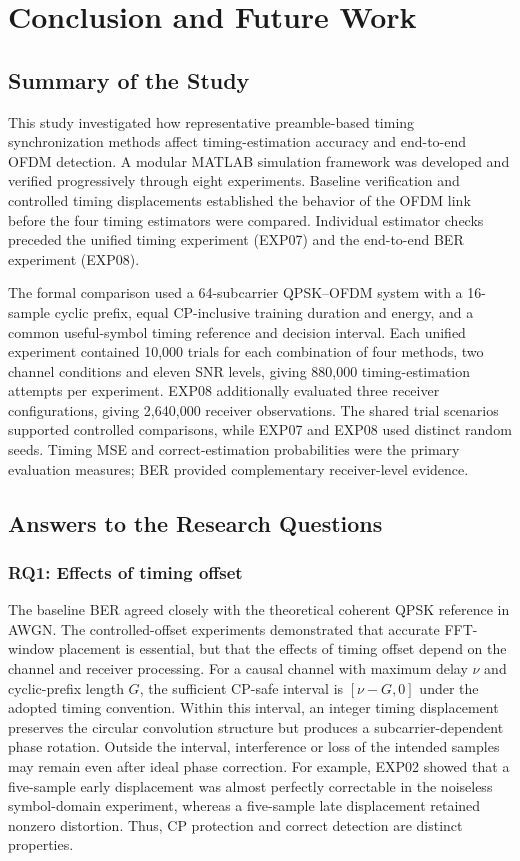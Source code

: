 \chapter{Conclusion and Future Work}
\label{chap:conclusion}

\section{Summary of the Study}

This study investigated how representative preamble-based timing
synchronization methods affect timing-estimation accuracy and end-to-end
OFDM detection. A modular MATLAB simulation framework was developed
and verified progressively through eight experiments. Baseline verification
and controlled timing displacements established the behavior of the OFDM
link before the four timing estimators were compared. Individual
estimator checks preceded the unified timing experiment (EXP07) and the
end-to-end BER experiment (EXP08).

The formal comparison used a 64-subcarrier QPSK--OFDM system with a
16-sample cyclic prefix, equal CP-inclusive training duration and energy,
and a common useful-symbol timing reference and decision interval.
Each unified experiment contained 10,000 trials for each combination of
four methods, two channel conditions and eleven SNR levels, giving
880,000 timing-estimation attempts per experiment. EXP08 additionally
evaluated three receiver configurations, giving 2,640,000 receiver
observations. The shared trial scenarios supported controlled comparisons,
while EXP07 and EXP08 used distinct random seeds. Timing MSE and
correct-estimation probabilities were the primary evaluation measures;
BER provided complementary receiver-level evidence.

\section[Research Questions]{Answers to the Research Questions}

\subsection*{RQ1: Effects of timing offset}

The baseline BER agreed closely with the theoretical coherent QPSK
reference in AWGN. The controlled-offset experiments demonstrated that
accurate FFT-window placement is essential, but that the effects of timing
offset depend on the channel and receiver processing. For a causal channel
with maximum delay $\nu$ and cyclic-prefix length $G$, the sufficient
CP-safe interval is $[\nu-G,0]$ under the adopted timing convention.
Within this interval, an integer timing displacement preserves the circular
convolution structure but produces a subcarrier-dependent phase rotation.
Outside the interval, interference or loss of the intended samples may
remain even after ideal phase correction. For example, EXP02 showed that
a five-sample early displacement was almost perfectly correctable in the
noiseless symbol-domain experiment, whereas a five-sample late displacement
retained nonzero distortion. Thus, CP protection and correct detection
are distinct properties.

